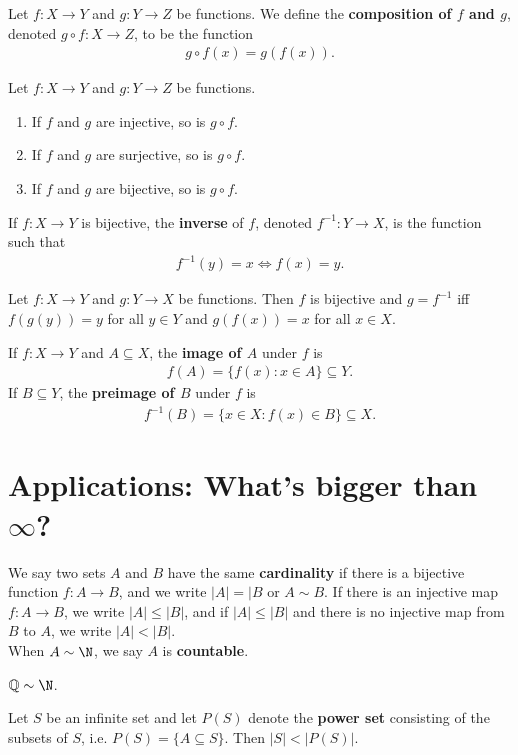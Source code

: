 \documentclass{article}
\begin{document}
\begin{definition}
	Let $f:X\to Y$ and $g:Y\to Z$ be functions. We define the \textbf{composition of $f$ and $g$}, denoted $g\circ f:X\to Z$, to be the function
	\begin{align*}
		g\circ f(x) = g(f(x)).
	\end{align*}
\end{definition}
\begin{theorem}
	Let $f:X\to Y$ and $g:Y\to Z$ be functions.
	\begin{enumerate}
		\item If $f$ and $g$ are injective, so is $g\circ f$.
		\item If $f$ and $g$ are surjective, so is $g\circ f$.
		\item If $f$ and $g$ are bijective, so is $g\circ f$.
	\end{enumerate}
\end{theorem}
\begin{definition}
	If $f:X\to Y$ is bijective, the \textbf{inverse} of $f$, denoted $f^{-1}:Y\to X$, is the function such that
	\begin{align*}
		f^{-1}(y) = x \Leftrightarrow f(x) = y.
	\end{align*}
\end{definition}
\begin{theorem}
	Let $f:X\to Y$ and $g:Y\to X$ be functions. Then $f$ is bijective and $g=f^{-1}$ iff $f(g(y))= y$ for all $y\in Y$ and $g(f(x))=x$ for all $x\in X$.
\end{theorem}
\begin{definition}
	If $f:X\to Y$ and $A\subseteq X$, the \textbf{image of $A$} under $f$ is
	\begin{align*}
		f(A) = \{f(x):x\in A\}\subseteq Y.
	\end{align*}
	If $B\subseteq Y$, the \textbf{preimage of $B$} under $f$ is
	\begin{align*}
		f^{-1}(B) = \{x\in X:f(x)\in B\}\subseteq X.
	\end{align*}
\end{definition}
\section*{Applications: What's bigger than $\infty$?}
\begin{definition}
	We say two sets $A$ and $B$ have the same \textbf{cardinality} if there is a bijective function $f:A\to B$, and we write $|A|=|B$ or $A\sim B$. If there is an injective map $f:A\to B$, we write $|A|\leq |B|$, and if $|A|\leq |B|$ and there is no injective map from $B$ to $A$, we write $|A|<|B|$.\\
	When $A\sim\N$, we say $A$ is \textbf{countable}.
\end{definition}
\begin{theorem}
	$\mathbb{Q}\sim\N$.
\end{theorem}
\begin{theorem}
	Let $S$ be an infinite set and let $P(S)$ denote the \textbf{power set} consisting of the subsets of $S$, i.e. $P(S) = \{A\subseteq S\}$. Then $|S|<|P(S)|$.
\end{theorem}
\end{document}
